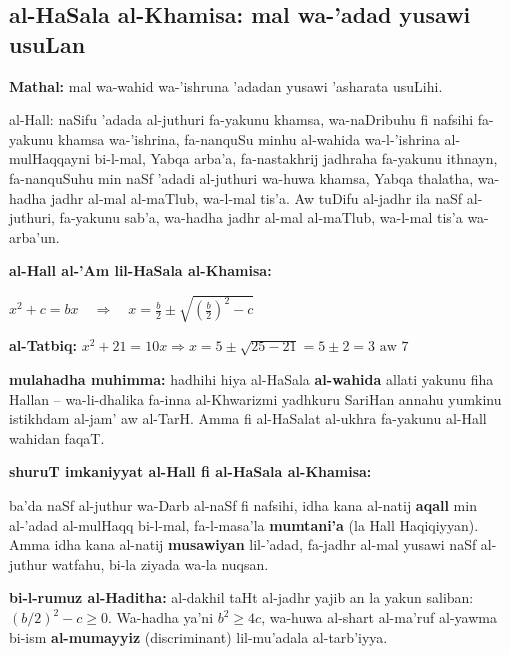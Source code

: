 \documentclass[11pt,a4paper]{book}
\begin{document}
\newpage

\subsection{al-HaSala al-Khamisa: mal wa-'adad yusawi usuLan}

\begin{originaltext}
\textbf{Mathal:} mal wa-wahid wa-'ishruna 'adadan yusawi 'asharata
usuLihi.

al-Hall: naSifu 'adada al-juthuri fa-yakunu khamsa, wa-naDribuhu fi
nafsihi fa-yakunu khamsa wa-'ishrina, fa-nanquSu minhu al-wahida
wa-l-'ishrina al-mulHaqqayni bi-l-mal, Yabqa arba'a, fa-nastakhrij
jadhraha fa-yakunu ithnayn, fa-nanquSuhu min naSf 'adadi al-juthuri
wa-huwa khamsa, Yabqa thalatha, wa-hadha jadhr al-mal al-maTlub, wa-l-mal
tis'a. Aw tuDifu al-jadhr ila naSf al-juthuri, fa-yakunu sab'a,
wa-hadha jadhr al-mal al-maTlub, wa-l-mal tis'a wa-arba'un.
\end{originaltext}

\begin{mathexplain}
\textbf{al-Hall al-'Am lil-HaSala al-Khamisa:}

\begin{center}
$\boxed{x^2 + c = bx \quad\Longrightarrow\quad x = \frac{b}{2} \pm \sqrt{\left(\frac{b}{2}\right)^2 - c}}$
\end{center}

\textbf{al-Tatbiq:}
$x^2 + 21 = 10x \Rightarrow x = 5 \pm \sqrt{25 - 21} = 5 \pm 2 = 3 \text{ aw } 7$

\textbf{mulahadha muhimma:} hadhihi hiya al-HaSala \textbf{al-wahida}
allati yakunu fiha Hallan -- wa-li-dhalika fa-inna al-Khwarizmi yadhkuru
SariHan annahu yumkinu istikhdam al-jam' aw al-TarH. Amma fi
al-HaSalat al-ukhra fa-yakunu al-Hall wahidan faqaT.
\end{mathexplain}

\begin{commentary}
\textbf{shuruT imkaniyyat al-Hall fi al-HaSala al-Khamisa:}

ba'da naSf al-juthur wa-Darb al-naSf fi nafsihi, idha kana al-natij
\textbf{aqall} min al-'adad al-mulHaqq bi-l-mal, fa-l-masa'la
\textbf{mumtani'a} (la Hall Haqiqiyyan). Amma idha kana al-natij
\textbf{musawiyan} lil-'adad, fa-jadhr al-mal yusawi naSf al-juthur
watfahu, bi-la ziyada wa-la nuqsan.

\vspace{0.2cm}

\textbf{bi-l-rumuz al-Haditha:} al-dakhil taHt al-jadhr yajib an la
yakun saliban: $(b/2)^2 - c \geq 0$. Wa-hadha ya'ni $b^2 \geq 4c$,
wa-huwa al-shart al-ma'ruf al-yawma bi-ism \textbf{al-mumayyiz}
(discriminant) lil-mu'adala al-tarb'iyya.
\end{commentary}
\end{document}
